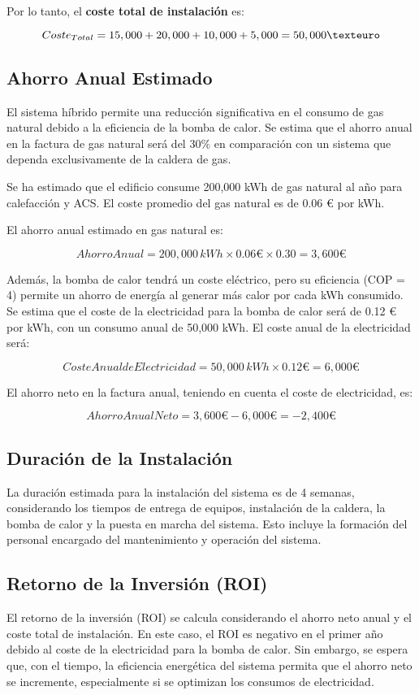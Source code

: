 \documentclass[a4paper,10pt,twocolumn]{article}
\begin{document}
\begin{Form}
	Por lo tanto, el \textbf{coste total de instalación} es:

	\[
		Coste_{Total}= \\
		15,000 + 20,000 + 10,000 + 5,000 = 50,000 €
	\]

	\subsection{Ahorro Anual Estimado}
	El sistema híbrido permite una reducción significativa en el consumo de gas natural debido a la eficiencia de la bomba de calor. Se estima que el ahorro anual en la factura de gas natural será del 30\% en comparación con un sistema que dependa exclusivamente de la caldera de gas.

	Se ha estimado que el edificio consume 200,000 kWh de gas natural al año para calefacción y ACS. El coste promedio del gas natural es de 0.06 € por kWh.

	El ahorro anual estimado en gas natural es:

	\[
		{Ahorro Anual} = 200,000 \, {kWh} \times 0.06 € \times 0.30 = 3,600 €
	\]

	Además, la bomba de calor tendrá un coste eléctrico, pero su eficiencia (COP = 4) permite un ahorro de energía al generar más calor por cada kWh consumido. Se estima que el coste de la electricidad para la bomba de calor será de 0.12 € por kWh, con un consumo anual de 50,000 kWh. El coste anual de la electricidad será:

	\[
		{Coste Anual de Electricidad} = 50,000 \, {kWh} \times 0.12 € = 6,000 €
	\]

	El ahorro neto en la factura anual, teniendo en cuenta el coste de electricidad, es:

	\[
		{Ahorro Anual Neto} = 3,600 € - 6,000 € = -2,400 €
	\]

	\subsection{Duración de la Instalación}
	La duración estimada para la instalación del sistema es de 4 semanas, considerando los tiempos de entrega de equipos, instalación de la caldera, la bomba de calor y la puesta en marcha del sistema. Esto incluye la formación del personal encargado del mantenimiento y operación del sistema.

	\subsection{Retorno de la Inversión (ROI)}
	El retorno de la inversión (ROI) se calcula considerando el ahorro neto anual y el coste total de instalación. En este caso, el ROI es negativo en el primer año debido al coste de la electricidad para la bomba de calor. Sin embargo, se espera que, con el tiempo, la eficiencia energética del sistema permita que el ahorro neto se incremente, especialmente si se optimizan los consumos de electricidad.


\end{Form}
\end{document}
